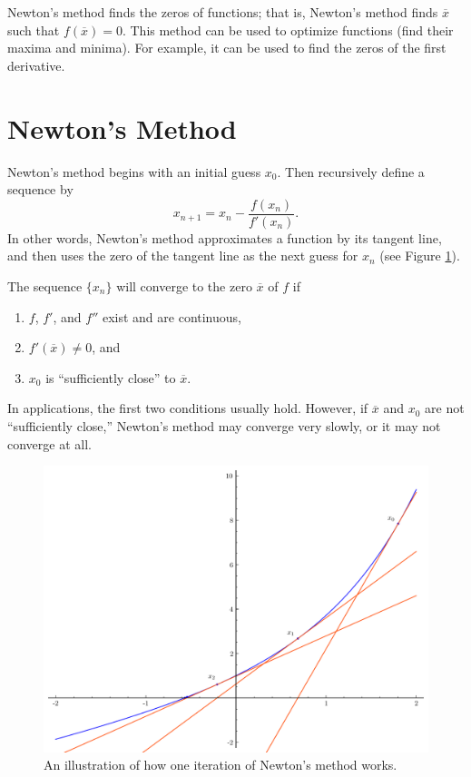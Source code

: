 \label{lab:NewtonsMethod}

Newton's method finds the zeros of functions; that is, Newton's method finds $\overline{x}$ such that $f\left(\overline{x}\right) = 0$.
This method can be used to optimize functions (find their maxima and minima).  For example, it can be used to find the zeros of the first derivative.

\section*{Newton's Method} %

Newton's method begins with an initial guess $x_0$.
Then recursively define a sequence by
\[
x_{n+1} = x_n - \frac{f(x_n)}{f'(x_n)}.
\]
In other words, Newton's method approximates a function by its tangent line, and then uses the zero of the tangent line as the next guess for $x_n$ (see Figure \ref{fig:newton}).

The sequence $\{x_n\}$ will converge to the zero $\overline{x}$ of $f$ if
\begin{enumerate}
\item $f$, $f'$, and $f''$ exist and are continuous,
\item $f'(\overline{x})\neq0$, and
\item $x_0$ is ``sufficiently close'' to $\overline{x}$.
\end{enumerate}
In applications, the first two conditions usually hold.
However, if $\overline{x}$ and $x_0$ are not ``sufficiently close,'' Newton's method may converge very slowly, or it may not converge at all.

\begin{figure}[h]
\label{fig:newton}
\centering
\includegraphics[width=\textwidth]{figures/newton_iters}
\caption{An illustration of how one iteration of Newton's method works.}
\end{figure}

